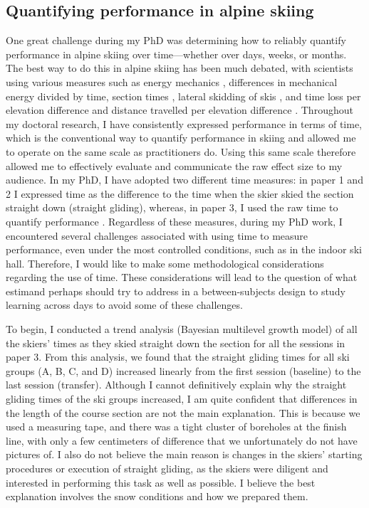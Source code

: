 \subsection{Quantifying performance in alpine skiing}
One great challenge during my PhD was determining how to reliably quantify performance in alpine skiing over time—whether over days, weeks, or months. The best way to do this in alpine skiing has been much debated, with scientists using various measures such as energy mechanics \cite{supej_differential_2008, supej_how_2010, supej_mechanical_2011} , differences in mechanical energy divided by time, section times \cite{supej_relations_2006}, lateral skidding of skis \cite{kirby_development_2009}, and time loss per elevation difference and distance travelled per elevation difference \cite{federolf_quantifying_2012}. Throughout my doctoral research, I have consistently expressed performance in terms of time, which is the conventional way to quantify performance in skiing and allowed me to operate on the same scale as practitioners do. Using this same scale therefore allowed me to effectively evaluate and communicate the raw effect size to my audience. In my PhD, I have adopted two different time measures: in paper 1 and 2 I expressed time as the difference to the time when the skier skied the section straight down (straight gliding), whereas, in paper 3, I used the raw time to quantify performance . Regardless of these measures, during my PhD work, I encountered several challenges associated with using time to measure performance, even under the most controlled conditions, such as in the indoor ski hall. Therefore, I would like to make some methodological considerations regarding the use of time. These considerations will lead to the question of what estimand perhaps should try to address in a between-subjects design to study learning across days to avoid some of these challenges.

To begin, I conducted a trend analysis (Bayesian multilevel growth model) of all the skiers' times as they skied straight down the section for all the sessions in paper 3. From this analysis, we found that the straight gliding times for all ski groups (A, B, C, and D) increased linearly from the first session (baseline) to the last session (transfer). Although I cannot definitively explain why the straight gliding times of the ski groups increased, I am quite confident that differences in the length of the course section are not the main explanation. This is because we used a measuring tape, and there was a tight cluster of boreholes at the finish line, with only a few centimeters of difference that we unfortunately do not have pictures of. I also do not believe the main reason is changes in the skiers' starting procedures or execution of straight gliding, as the skiers were diligent and interested in performing this task as well as possible. I believe the best explanation involves the snow conditions and how we prepared them.  

